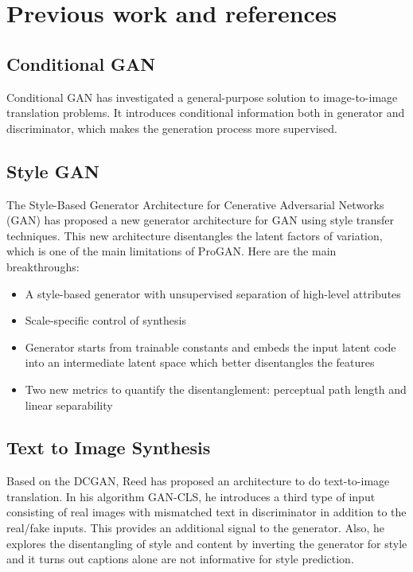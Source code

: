 \documentclass{article}
\begin{document}
\section{Previous work and references}
\subsection{Conditional GAN}
Conditional GAN\cite{cgan} has investigated a general-purpose solution to image-to-image translation problems. It introduces conditional information both in generator and discriminator, which makes the generation process more supervised.
\subsection{Style GAN}
The Style-Based Generator Architecture for Cenerative Adversarial Networks (GAN)\cite{stylegan} has proposed a new generator architecture for GAN using style transfer techniques\cite{styletransferog}. This new architecture disentangles the latent factors of variation, which is one of the main limitations of ProGAN\cite{progan}. Here are the main breakthroughs:

\begin{itemize}
\item A style-based generator with unsupervised separation of high-level attributes 
\item Scale-specific control of synthesis
\item Generator starts from trainable constants and embeds the input latent code into an intermediate latent space which better disentangles the features
\item Two new metrics to quantify the disentanglement: perceptual path length and linear separability

\end{itemize}
\subsection{Text to Image Synthesis}
Based on the DCGAN\cite{dcgan}, Reed has proposed an architecture to do text-to-image translation. In his algorithm GAN-CLS\cite{text2image}, he introduces a third type of input consisting of real images with mismatched text in discriminator in addition to the real/fake inputs. This provides an additional signal to the generator. Also, he explores the disentangling of style and content by inverting the generator for style and it turns out captions alone are not informative for style prediction.
\end{document}
